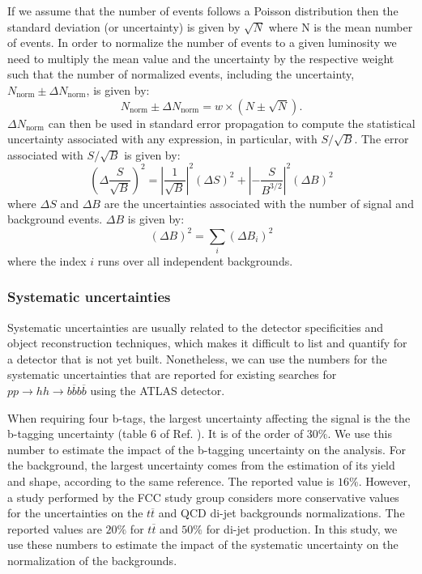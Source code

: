 If we assume that the number of events follows a Poisson distribution then the standard deviation (or uncertainty) is given by $\sqrt{N}$ where N is the mean number of events. In order to normalize the number of events to a given luminosity we need to multiply the mean value and the uncertainty by the respective weight such that the number of normalized events, including the uncertainty, $N_{\text{norm}}\pm \Delta N_{\text{norm}}$, is given by:
\begin{equation}
	N_{\text{norm}}\pm \Delta N_{\text{norm}}=w\times \left(N \pm \sqrt{N}\right).
\end{equation}
$\Delta N_{\text{norm}}$ can then be used in standard error propagation to compute the statistical uncertainty associated with any expression, in particular, with $S/\sqrt{B}$. The error associated with $S/\sqrt{B}$ is given by:
\begin{equation}
	\left(\Delta\frac{S}{\sqrt{B}}\right)^2=\left|\frac{1}{\sqrt{B}}\right|^2 (\Delta S)^2+\left|-\frac{S}{B^{3/2}}\right|^2 (\Delta B)^2
\end{equation}
where $\Delta S$ and $\Delta B$ are the uncertainties associated with the number of signal and background events. $\Delta B$ is given by:
\begin{equation}
		(\Delta B)^2 =\sum_i (\Delta B_i)^2
\end{equation}
where the index $i$ runs over all independent backgrounds.

\subsubsection{Systematic uncertainties}

Systematic uncertainties are usually related to the detector specificities and object reconstruction techniques, which makes it difficult to list and quantify for a detector that is not yet built. Nonetheless, we can use the numbers for the systematic uncertainties that are reported for existing searches for $pp\rightarrow hh\rightarrow b\overline{b}b\overline{b}$ using the ATLAS detector.

When requiring four b-tags, the largest uncertainty affecting the signal is the the b-tagging uncertainty (table 6 of Ref. \cite{hh2bbbbATLAS1}). It is of the order of $30\%$. We use this number to estimate the impact of the b-tagging uncertainty on the analysis.
For the background, the largest uncertainty comes from the estimation of its yield and shape, according to the same reference. The reported value is $16\%$. However, a study performed by the FCC study group \cite{FCCphysClement} considers more conservative values for the uncertainties on the $t\overline{t}$ and  QCD di-jet backgrounds normalizations. The reported values are $20\%$ for $t\overline{t}$ and $50\%$ for di-jet production. In this study, we use these numbers to estimate the impact of the systematic uncertainty on the normalization of the backgrounds.

